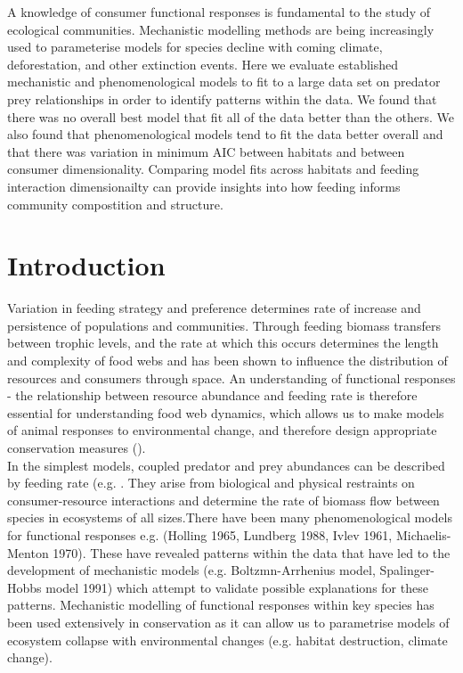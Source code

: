 \documentclass[11pt]{article}
\begin{document}
	A knowledge of consumer functional responses is fundamental to the study of ecological communities. Mechanistic modelling methods are being increasingly used to parameterise models for species decline with coming climate, deforestation, and other extinction events. Here we evaluate established mechanistic and phenomenological models to fit to a large data set on predator prey relationships in order to identify patterns within the data. We found that there was no overall best model that fit all of the data better than the others. We also found that phenomenological models tend to fit the data better overall and that there was variation in minimum AIC between habitats and between consumer dimensionality. Comparing model fits across habitats and feeding interaction dimensionailty can provide insights into how feeding informs community compostition and structure. 
	
	\section*{Introduction}
	Variation in feeding strategy and preference determines rate of increase and persistence of populations and communities. Through feeding biomass transfers between trophic levels, and the rate at which this occurs determines the length and complexity of food webs and has been shown to influence the distribution of resources and consumers through space. An understanding of functional responses - the relationship between resource abundance and feeding rate is therefore essential for understanding food web dynamics, which allows us to make models of animal responses to environmental change, and therefore design appropriate conservation measures (\cite{Deville2013}). \\
	
	In the simplest models, coupled predator and prey abundances can be described by feeding rate (e.g. \cite{Kopf1925a}. They arise from biological and physical restraints on consumer-resource interactions and determine the rate of biomass flow between species in ecosystems of all sizes.There have been many phenomenological models for functional responses e.g. (Holling 1965, Lundberg 1988, Ivlev 1961,  Michaelis-Menton 1970). These have revealed patterns within the data that have led to the development of mechanistic models (e.g. Boltzmn-Arrhenius model, Spalinger-Hobbs model 1991) which attempt to validate possible explanations for these patterns. Mechanistic modelling of functional responses within key species has been used extensively in conservation as it can allow us to parametrise models of ecosystem collapse with environmental changes (e.g. habitat destruction, climate change).\\
	
\end{document}
